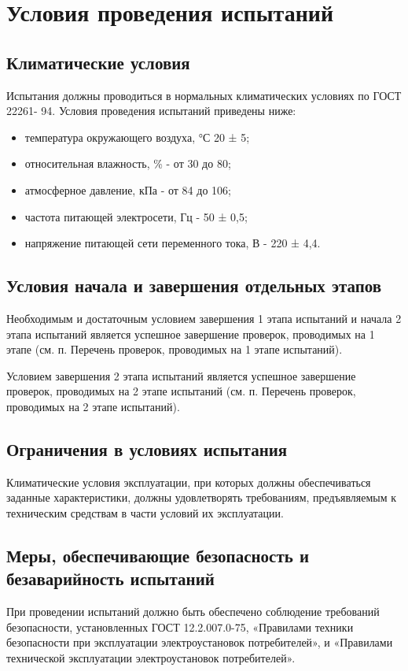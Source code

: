 \documentclass[14pt,a4paper,final]{extreport}
\begin{document}
\section{Условия проведения испытаний}
\subsection{Климатические условия}
Испытания должны проводиться в нормальных климатических условиях по ГОСТ 22261-
94. Условия проведения испытаний приведены ниже:

\begin{itemize}
	\item температура окружающего воздуха, °С 20 ± 5;
	\item относительная влажность, \% - от 30 до 80;
	\item атмосферное давление, кПа - от 84 до 106;
	\item частота питающей электросети, Гц - 50 ± 0,5;
	\item напряжение питающей сети переменного тока, В - 220 ± 4,4.
\end{itemize}

\subsection{Условия начала и завершения отдельных этапов}
Необходимым и достаточным условием завершения 1 этапа испытаний и начала 2 этапа испытаний является успешное завершение проверок, проводимых на 1 этапе (см. п. Перечень проверок, проводимых на 1 этапе испытаний).

Условием завершения 2 этапа испытаний является успешное завершение проверок, проводимых на 2 этапе испытаний (см. п. Перечень проверок, проводимых на 2 этапе испытаний).

\subsection{Ограничения в условиях испытания}
Климатические условия эксплуатации, при которых должны обеспечиваться заданные характеристики, должны удовлетворять требованиям, предъявляемым к техническим средствам в части условий их эксплуатации.

\subsection{Меры, обеспечивающие безопасность и безаварийность испытаний}
При проведении испытаний должно быть обеспечено соблюдение требований безопасности, установленных ГОСТ 12.2.007.0-75, «Правилами техники безопасности при эксплуатации электроустановок потребителей», и «Правилами технической эксплуатации электроустановок потребителей».
\end{document}
